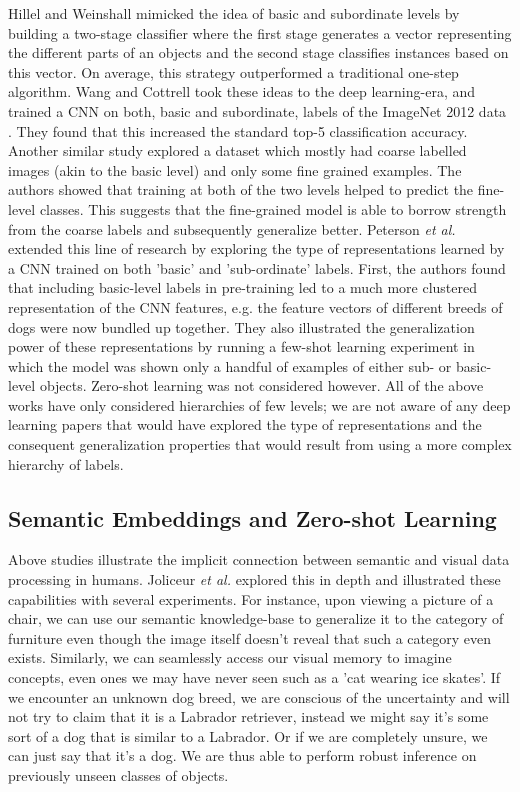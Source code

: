 \documentclass[12pt]{report}
\begin{document}
Hillel and Weinshall \cite{Hillel2007} mimicked the idea of basic and subordinate levels by building a two-stage classifier where the first stage generates a vector representing the different parts of an objects and the second stage classifies instances based on this vector. On average, this strategy outperformed a traditional one-step algorithm. Wang and Cottrell \cite{Wang2015} took these ideas to the deep learning-era, and trained a CNN on both, basic and subordinate, labels of the ImageNet 2012 data \cite{Russakovsky2015}. They found that this increased the standard top-5 classification accuracy. Another similar study \cite{Lei2018} explored a dataset which mostly had coarse labelled images (akin to the basic level) and only some fine grained examples. The authors showed that training at both of the two levels helped to predict the fine-level classes. This suggests that the fine-grained model is able to borrow strength from the coarse labels and subsequently generalize better. Peterson \textit{et al.} \cite{Peterson2018} extended this line of research by exploring the type of representations learned by a CNN trained on both 'basic' and 'sub-ordinate' labels. First, the authors found that including basic-level labels in pre-training led to a much more clustered representation of the CNN features, e.g. the feature vectors of different breeds of dogs were now bundled up together. They also illustrated the generalization power of these representations by running a few-shot learning experiment in which the model was shown only a handful of examples of either sub- or basic-level objects. Zero-shot learning was not considered however. All of the above works have only considered hierarchies of few levels; we are not aware of any deep learning papers that would have explored the type of representations and the consequent generalization properties that would result from using a more complex hierarchy of labels.

\subsection{Semantic Embeddings and Zero-shot Learning} \label{sec:semlit}
Above studies illustrate the implicit connection between semantic and visual data processing in humans. Joliceur \textit{et al.} \cite{Joliceur1984} explored this in depth and illustrated these capabilities with several experiments. For instance, upon viewing a picture of a chair, we can use our semantic knowledge-base to generalize it to the category of furniture even though the image itself doesn't reveal that such a category even exists. Similarly, we can seamlessly access our visual memory to imagine concepts, even ones we may have never seen such as a 'cat wearing ice skates'. If we encounter an unknown dog breed, we are conscious of the uncertainty and will not try to claim that it is a Labrador retriever, instead we might say it's some sort of a dog that is similar to a Labrador. Or if we are completely unsure, we can just say that it's a dog. We are thus able to perform robust inference on previously unseen classes of objects.
\end{document}
